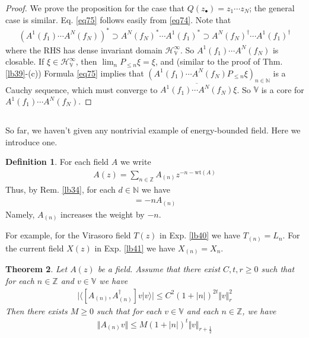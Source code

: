 \documentclass[12pt,b5paper,notitlepage]{article}
\theoremstyle{definition}
\newtheorem{df}{Definition}[section]
\theoremstyle{plain}
\newtheorem{thm}[df]{Theorem}
\newcommand{\ovl}{\overline}
\newcommand{\bk}[1]{\langle {#1}\rangle}
\newcommand{\blt}{\bullet}
\newcommand{\Vbb}{\mathbb V}
\newcommand{\Nbb}{\mathbb N}
\newcommand{\Zbb}{\mathbb Z}
\newcommand{\wt}{\mathrm{wt}}
\newcommand{\HV}{\mathcal H_{\mathbb V}}
\numberwithin{equation}{section}
\begin{document}
\begin{proof}
We prove the proposition for the case that $Q(z_\blt)=z_1\cdots z_N$; the general case is similar. Eq. \eqref{eq75} follows easily from \eqref{eq74}. Note that
\begin{align}\label{eq128}
(A^1(f_1)\cdots A^N(f_N))^*\supset A^N(f_N)^*\cdots A^1(f_1)^*\supset A^N(f_N)^\dagger\cdots A^1(f_1)^\dagger
\end{align}
where the RHS has dense invariant domain $\HV^\infty$. So $A^1(f_1)\cdots A^N(f_N)$ is closable. If $\xi\in\HV^\infty$, then $\lim_n P_{\leq n}\xi=\xi$, and (similar to the proof of Thm. \ref{lb39}-(c)) Formula \eqref{eq75} implies that $(A^1(f_1)\cdots A^N(f_N)P_{\leq n}\xi)_{n\in\Nbb}$ is a Cauchy sequence, which must converge to $\ovl{A^1(f_1)\cdots A^N(f_N)}\xi$. So $\Vbb$ is a core for $A^1(f_1)\cdots A^N(f_N)$.
\end{proof}



\subsection{}


So far, we haven't given any nontrivial example of energy-bounded field. Here we introduce one. 

\begin{df}
For each field $A$ we write 
\begin{align}
A(z)=\sum_{n\in\Zbb} A_{(n)}z^{-n-\wt(A)}
\end{align}
Thus, by Rem. \ref{lb34}, for each $d\in\Nbb$ we have
\begin{align}
[L_0,A_{(n)}]=-nA_{(n)}
\end{align}
Namely, $A_{(n)}$ increases the weight by $-n$.
\end{df}

For example, for the Virasoro field $T(z)$ in Exp. \ref{lb40} we have $T_{(n)}=L_n$. For the current field $X(z)$ in Exp. \ref{lb41} we have $X_{(n)}=X_n$.

\begin{thm}\label{lb42}
Let $A(z)$ be a field. Assume that there exist $C,t,r\geq0$ such that for each $n\in\Zbb$ and $v\in\Vbb$ we have
\begin{align}\label{eq66}
\big|\bk{[A_{(n)},A_{(n)}^\dagger]v|v}\big|\leq C^2(1+|n|)^{2t}\Vert v\Vert_r^2
\end{align}
Then there exists $M\geq0$ such that for each $v\in\Vbb$ and each  $n\in\Zbb$, we have
\begin{align}\label{eq65}
\Vert A_{(n)}v\Vert \leq M(1+|n|)^t\Vert v\Vert_{r+\frac 12}
\end{align}
\end{thm}
\end{document}
